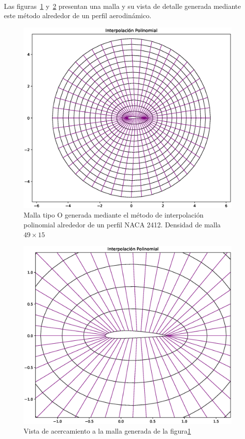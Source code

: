 \documentclass[letterpaper, openright, 12pt]{book}
\begin{document}
    \paragraph*{}
    Las figuras~\ref{fig:malla-inter} y~\ref{fig:malla-inter-cerca}
    presentan una malla y su vista de detalle generada mediante este método
    alrededor de un perfil aerodinámico.
    \begin{figure}[htbp!]
        \centering
        \includegraphics[keepaspectratio, width=120mm]{./Imagenes/M-inter_pol}
        \captionsetup{justification=centering, margin=2cm}
        \caption[Malla Interpolación Polinomial]{Malla tipo O generada
        mediante el método de interpolación polinomial alrededor de un
        perfil NACA 2412. Densidad de malla $49\times15$}
        \label{fig:malla-inter}
    \end{figure}
    \begin{figure}[htbp!]
        \centering
        \includegraphics[width=120mm]{./Imagenes/M-inter_pol_cerca}
        \captionsetup{justification=centering, margin=2cm}
        \caption[Malla Interpolación Polinomial Acercamiento]{Vista de
        acercamiento a la malla generada de la figura\ref{fig:malla-inter}}
        \label{fig:malla-inter-cerca}
    \end{figure}
\end{document}

